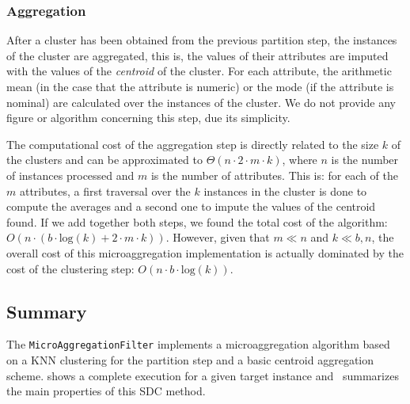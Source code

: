 \subsubsection{Aggregation}

After a cluster has been obtained from the previous partition step, the instances of the cluster are aggregated, this is, the values of their attributes are imputed with the values of the \textit{centroid} of the cluster. For each attribute, the arithmetic mean (in the case that the attribute is numeric) or the mode (if the attribute is nominal) are calculated over the instances of the cluster. We do not provide any figure or algorithm concerning this step, due its simplicity.

The computational cost of the aggregation step is directly related to the size $k$ of the clusters and can be approximated to $\Theta(n \cdot 2 \cdot m \cdot k)$, where $n$ is the number of instances processed and $m$ is the number of attributes. This is: for each of the $m$ attributes, a first traversal over the $k$ instances in the cluster is done to compute the averages and a second one to impute the values of the centroid found. If we add together both steps, we found the total cost of the algorithm: $O(n \cdot (b \cdot \mathrm{log}(k) + 2 \cdot m \cdot k))$. However, given that $m \ll n$ and $k \ll b, n$, the overall cost of this microaggregation implementation is actually dominated by the cost of the clustering step: $O(n \cdot b \cdot \mathrm{log}(k))$.

\subsection{Summary}
\label{Implementation:Microaggregation:Summary}

The \texttt{MicroAggregationFilter} implements a microaggregation algorithm based on a KNN clustering for the partition step and a basic centroid aggregation scheme.  shows a complete execution for a given target instance and~ summarizes the main properties of this SDC method.


